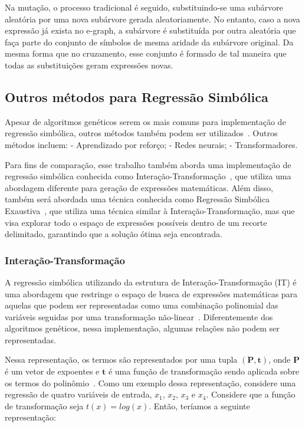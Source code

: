 Na mutação, o processo tradicional é seguido, substituindo-se uma subárvore aleatória por uma nova subárvore gerada aleatoriamente. No entanto, caso a nova expressão já exista no e-graph, a subárvore é substituída por outra aleatória que faça parte do conjunto de símbolos de mesma aridade da subárvore original. Da mesma forma que no cruzamento, esse conjunto é formado de tal maneira que todas as substituições geram expressões novas.

\subsection{Outros métodos para Regressão Simbólica}

Apesar de algoritmos genéticos serem os mais comuns para implementação de regressão simbólica, outros métodos também podem ser utilizados~\cite{Bartlett_2024, Makke2024}. Outros métodos incluem:
- Aprendizado por reforço;
- Redes neurais;
- Transformadores.

Para fins de comparação, esse trabalho também aborda uma implementação de regressão simbólica conhecida como Interação-Transformação~\cite{lsritr}, que utiliza uma abordagem diferente para geração de expressões matemáticas. Além disso, também será abordada uma técnica conhecida como Regressão Simbólica Exaustiva~\cite{Bartlett_2024}, que utiliza uma técnica similar à Interação-Transformação, mas que visa explorar todo o espaço de expressões possíveis dentro de um recorte delimitado, garantindo que a solução ótima seja encontrada.

\subsubsection{Interação-Transformação}

A regressão simbólica utilizando da estrutura de Interação-Transformação (IT) é uma abordagem que restringe o espaço de busca de expressões matemáticas para aquelas que podem ser representadas como uma combinação polinomial das variáveis seguidas por uma transformação não-linear~\cite{lsritr}. Diferentemente dos algoritmos genéticos, nessa implementação, algumas relações não podem ser representadas.

Nessa representação, os termos são representados por uma tupla $(\mathbf{P}, \mathbf{t})$, onde $\mathbf{P}$ é um vetor de expoentes e $\mathbf{t}$ é uma função de transformação sendo aplicada sobre os termos do polinômio~\cite{lsritr}. Como um exemplo dessa representação, considere uma regressão de quatro variáveis de entrada, $x_1$, $x_2$, $x_3$ e $x_4$. Considere que a função de transformação seja $t(x) = log(x)$. Então, teríamos a seguinte representação:

